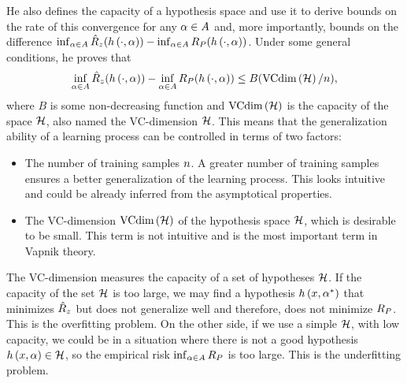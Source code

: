  He also defines the capacity of a hypothesis space and use it to derive bounds on the rate of this convergence for any $\alpha \in A$ and, more importantly, bounds on the difference $\inf_{\alpha \in A} \hat{R}_z(h\left(\cdot, \alpha\right)) - \inf_{\alpha \in A} R_P(h\left(\cdot, \alpha\right))$.
Under some general conditions, he proves that
\begin{equation}\label{eq:ordinary_generalization_bound}
    \inf_{\param \in \paramspace} \emprisk(\hyp{\cdot}{\param}) - \inf_{\param \in \paramspace} \exprisk(\hyp{\cdot}{\param}) \leq B(\vcdim{\hypspace}/\nsamples) ,
\end{equation}
where $B$ is some non-decreasing function and $\text{VCdim}\left(\mathcal{H}\right)$ is the capacity of the space $\mathcal{H}$, also named the VC-dimension $\mathcal{H}$. This means that the generalization ability of a learning process can be controlled in terms of two factors:
\begin{itemize}
    \item The number of training samples $n$. A greater number of training samples ensures a better generalization of the learning process. This looks intuitive and could be already inferred from the asymptotical properties. 
    \item The VC-dimension $\text{VCdim}\left(\mathcal{H}\right)$ of the hypothesis space $\mathcal{H}$, which is desirable to be small. This term is not intuitive and is the most important term in Vapnik theory.
\end{itemize}
The VC-dimension measures the capacity of a set of hypotheses $\mathcal{H}$. 
If the capacity of the set $\mathcal{H}$ is too large, we may find a
hypothesis $h\left(x, {\alpha}^*\right)$ that minimizes $\hat{R}_z$ but does not 
generalize well and therefore, does not minimize $R_P$. This is the 
overfitting problem. 
On the other side, if we use a simple $\mathcal{H}$, 
with low capacity, we could be in a situation where there is not a good hypothesis $h\left(x, \alpha\right) \in \mathcal{H}$, so the empirical risk $\inf_{\alpha \in A} R_P$ is too large. This is the underfitting problem.

